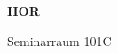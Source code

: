 \documentclass[a4paper]{article}
\begin{document}
\printGenericVSLHeader
\begin{center}
\begin{vsltext}{3cm}{4cm}

   \vspace{0.5cm} 

    \textbf{HOR} 

    \vspace{1.5cm}

    Seminarraum 101C

\end{vsltext}

\end{center}
\end{document}
